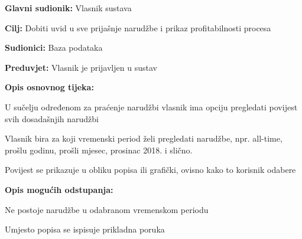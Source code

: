 					\noindent {}
					\begin{packed_item}
	
						\item \textbf{Glavni sudionik: }Vlasnik sustava
						\item  \textbf{Cilj: }Dobiti uvid u sve prijašnje narudžbe i prikaz profitabilnosti procesa
						\item  \textbf{Sudionici: }Baza podataka
						\item  \textbf{Preduvjet: }Vlasnik je prijavljen u sustav
						\item  \textbf{Opis osnovnog tijeka:}
						
						\item[] \begin{packed_enum}
							\item U sučelju određenom za praćenje narudžbi vlasnik ima opciju pregledati povijest svih dosadašnjih narudžbi
							\item Vlasnik bira za koji vremenski period želi pregledati narudžbe, npr. all-time, prošlu godinu, prošli mjesec, prosinac 2018. i slično.
							\item Povijest se prikazuje u obliku popisa ili grafički, ovisno kako to korisnik odabere
						\end{packed_enum}
						
						\item  \textbf{Opis mogućih odstupanja:}
						
						\item[] \begin{packed_item}
	
							\item[2.a] Ne postoje narudžbe u odabranom vremenskom periodu
							\item[] \begin{packed_enum}
								\item Umjesto popisa se ispisuje prikladna poruka
							\end{packed_enum}
						\end{packed_item}
					\end{packed_item}
					
